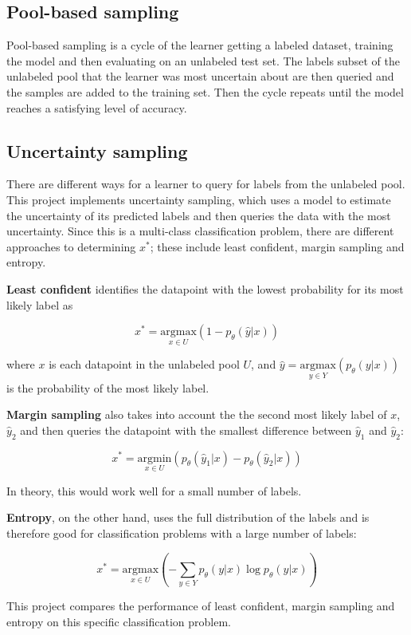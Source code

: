 \documentclass[12pt,fleqn]{article}
\begin{document}
\begin{multicols}{2}
		
		\subsection{Pool-based sampling}
		Pool-based sampling is a cycle of the learner getting a labeled dataset, training the model and then evaluating on an unlabeled test set. The labels subset of the unlabeled pool that the learner was most uncertain about are then queried and the samples are added to the training set. Then the cycle repeats until the model reaches a satisfying level of accuracy.  
		
		\subsection{Uncertainty sampling}
		There are different ways for a learner to query for labels from the unlabeled pool. This project implements uncertainty sampling, which uses a model to estimate the uncertainty of its predicted labels and then queries the data with the most uncertainty. Since this is a multi-class classification problem, there are different approaches to determining $x^*$; these include least confident, margin sampling and entropy. 
		
		\textbf{Least confident} identifies the datapoint with the lowest probability for its most likely label as
		
		$$x^*=\underset{x\in U}{\text{argmax}}(1-p_\theta(\hat{y}|x))$$ 
		
		where $x$ is each datapoint in the unlabeled pool $U$, and $\hat{y}=\underset{y\in Y}{\text{argmax}}(p_\theta(y|x))$ is the probability of the most likely label. 
		
		\textbf{Margin sampling} also takes into account the the second most likely label of $x$, $\hat{y}_2$ and then queries the datapoint with the smallest difference between $\hat{y}_1$ and $\hat{y}_2$:
		
		$$x^*=\underset{x\in U}{\text{argmin}}(p_\theta(\hat{y}_1|x)-p_\theta(\hat{y}_2|x))$$
		
		In theory, this would work well for a small number of labels. 
		
		\textbf{Entropy}, on the other hand, uses the full distribution of the labels and is therefore good for classification problems with a large number of labels:
		
		$$x^*=\underset{x\in U}{\text{argmax}}\left(-\sum_{y\in Y}p_\theta(y|x)\log p_\theta(y|x)\right)$$
		 
		This project compares the performance of least confident, margin sampling and entropy on this specific classification problem. 
		 

\end{multicols}
\end{document}
